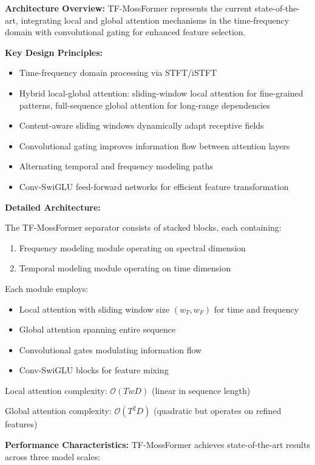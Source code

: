 \documentclass[conference]{IEEEtran}
\begin{document}
\textbf{Architecture Overview:} TF-MossFormer \cite{pan2024tfmossformer} represents the current state-of-the-art, integrating local and global attention mechanisms in the time-frequency domain with convolutional gating for enhanced feature selection.

\textbf{Key Design Principles:}
\begin{itemize}
    \item Time-frequency domain processing via STFT/iSTFT
    \item Hybrid local-global attention: sliding-window local attention for fine-grained patterns, full-sequence global attention for long-range dependencies
    \item Content-aware sliding windows dynamically adapt receptive fields
    \item Convolutional gating improves information flow between attention layers
    \item Alternating temporal and frequency modeling paths
    \item Conv-SwiGLU feed-forward networks for efficient feature transformation
\end{itemize}

\textbf{Detailed Architecture:}

The TF-MossFormer separator consists of stacked blocks, each containing:
\begin{enumerate}
    \item Frequency modeling module operating on spectral dimension
    \item Temporal modeling module operating on time dimension
\end{enumerate}

Each module employs:
\begin{itemize}
    \item Local attention with sliding window size $(w_T, w_F)$ for time and frequency
    \item Global attention spanning entire sequence
    \item Convolutional gates modulating information flow
    \item Conv-SwiGLU blocks for feature mixing
\end{itemize}

Local attention complexity: $\mathcal{O}(TwD)$ (linear in sequence length)

Global attention complexity: $\mathcal{O}(T^2D)$ (quadratic but operates on refined features)

\textbf{Performance Characteristics:} TF-MossFormer achieves state-of-the-art results across three model scales:
\end{document}
